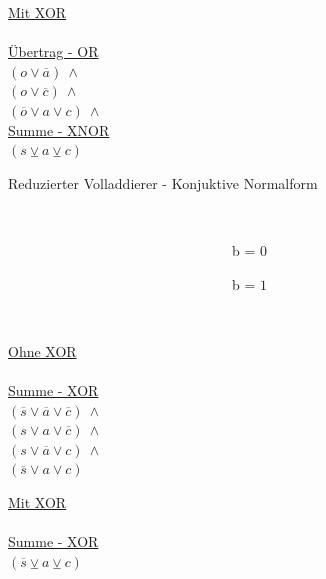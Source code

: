 \begin{figure}[!h]
\begin{minipage}[l]{3.5cm}
    \underline{Mit XOR}\\
    ~\\
    \underline{Übertrag - OR}\\
    $ (o \vee \overline{a}) ~ \wedge $\\
    $ (o \vee \overline{c}) ~ \wedge $\\
    $ (\overline{o} \vee a \vee c) ~ \wedge $\\
    \underline{Summe - XNOR}\\
    $ (s \veebar a \veebar c) $
  \end{minipage}
  \caption{Reduzierter Volladdierer - Konjuktive Normalform}
  \label{fig:red_fulladder_cnf}
\end{figure}

\begin{figure}[!h]
  \centering
  \begin{minipage}[c]{0.3cm}
    ~
  \end{minipage}
  \begin{minipage}[c]{7.1cm}
    ~~~~~~~~~~~~~~~~~~~~~~~~~~~~~~~~b = $0$
  \end{minipage}
  \begin{minipage}[c]{7cm}
    ~~~~~~~~~~~~~~~~~~~~~~~~~~~~~~~~b = $1$
  \end{minipage}
  \begin{minipage}[l]{0.4cm}
    ~
  \end{minipage}
  \begin{minipage}[l]{3.5cm}
    \underline{Ohne XOR}\\
    ~\\
    \underline{Summe - XOR}\\
    $ (\overline{s} \vee \overline{a} \vee \overline{c}) ~ \wedge $\\
    $ (s \vee a \vee \overline{c}) ~ \wedge $\\
    $ (s \vee \overline{a} \vee c) ~ \wedge $\\
    $ (\overline{s} \vee a \vee c) $
  \end{minipage}
  \begin{minipage}[l]{3.5cm}
    \underline{Mit XOR}\\
    ~\\
    \underline{Summe - XOR}\\
    $ (\overline{s} \veebar a \veebar c) $\\
    ~\\
    ~\\
    ~
  \end{minipage}
  \begin{minipage}[l]{3.5cm}

\end{minipage}
\end{figure}

